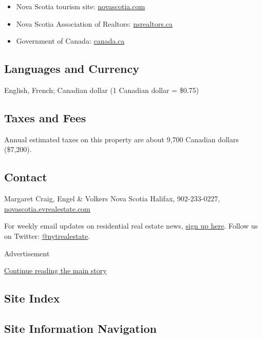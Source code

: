 \begin{itemize}
\item
  Nova Scotia tourism site:
  \href{http://novascotia.com/}{novascotia.com}
\item
  Nova Scotia Association of Realtors:
  \href{http://nsrealtors.ca/}{nsrealtors.ca}
\item
  Government of Canada: \href{http://canada.ca/}{canada.ca}
\end{itemize}

\hypertarget{languages-and-currency}{%
\subsection{Languages and Currency}\label{languages-and-currency}}

English, French; Canadian dollar (1 Canadian dollar = \$0.75)

\hypertarget{taxes-and-fees}{%
\subsection{Taxes and Fees}\label{taxes-and-fees}}

Annual estimated taxes on this property are about 9,700 Canadian dollars
(\$7,200).

\hypertarget{contact}{%
\subsection{Contact}\label{contact}}

Margaret Craig, Engel \& Volkers Nova Scotia Halifax, 902-233-0227,
\href{http://novascotia.evrealestate.com/}{novascotia.evrealestate.com}

For weekly email updates on residential real estate news,
\href{http://www.nytimes3xbfgragh.onion/newsletters/realestate/}{sign up
here}. Follow us on Twitter:
\href{https://twitter.com/nytrealestate}{@nytrealestate}.

Advertisement

\protect\hyperlink{after-bottom}{Continue reading the main story}

\hypertarget{site-index}{%
\subsection{Site Index}\label{site-index}}

\hypertarget{site-information-navigation}{%
\subsection{Site Information
Navigation}\label{site-information-navigation}}

